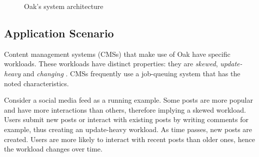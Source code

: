 \message{ !name(thesis.tex)}\documentclass[abstracton,12pt]{scrartcl}
\theoremstyle{definition}
\begin{document}
\begin{figure}[h]
  \begin{center}
  \end{center}
  \caption{Oak's system architecture}
  \label{fig:architecture}
\end{figure}

\subsection{Application Scenario}
\label{sec:application_scenario}

Content management systems (CMSs) that make use of Oak have specific workloads.
These workloads have distinct properties: they are \textit{skewed},
\textit{update-heavy} and \textit{changing} \cite{KW17}. CMSs frequently use a
job-queuing system that has the noted characteristics.

Consider a social media feed as a running example. Some posts are more popular
and have more interactions than others, therefore implying a
skewed workload. Users submit new posts or interact with existing posts by
writing comments for example, thus creating an update-heavy workload. As time
passes, new posts are created. Users are more likely to interact with recent
posts than older ones, hence the workload changes over time.
\end{document}
